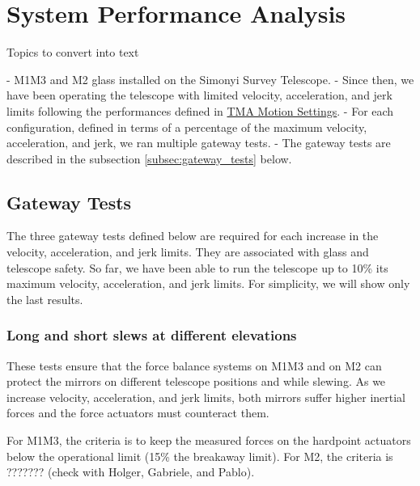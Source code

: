 \section{System Performance Analysis}
\label{sec:system_performance_analysis}

\newcommand{\TMAMotionSettings}{\href{https://rubinobs.atlassian.net/wiki/spaces/LSSTCOM/pages/53741249/TMA+Motion+Settings}{TMA Motion Settings}}

Topics to convert into text

\begin{itemize}
    - M1M3 and M2 glass installed on the Simonyi Survey Telescope.
    - Since then, we have been operating the telescope with limited velocity,
    acceleration, and jerk limits following the performances defined in \TMAMotionSettings.
    - For each configuration, defined in terms of a percentage of the maximum
    velocity, acceleration, and jerk, we ran multiple gateway tests.
    - The gateway tests are described in the subsection \ref{subsec:gateway_tests} below.
\end{itemize}

\subsection{Gateway Tests}

The three gateway tests defined below are required for each increase in the
velocity, acceleration, and jerk limits. They are associated with glass and
telescope safety. So far, we have been able to run the telescope up to 10\%
its maximum velocity, acceleration, and jerk limits. For simplicity, we will
show only the last results.

\subsubsection{Long and short slews at different elevations}
\label{subsubsec:long_and_short_slews}

These tests ensure that the force balance systems on M1M3 and on M2 can protect
the mirrors on different telescope positions and while slewing. As we increase
velocity, acceleration, and jerk limits, both mirrors suffer higher inertial
forces and the force actuators must counteract them.

For M1M3, the criteria is to keep the measured forces on the hardpoint actuators
below the operational limit (15\% the breakaway limit). For M2, the criteria is
??????? (check with Holger, Gabriele, and Pablo). %

